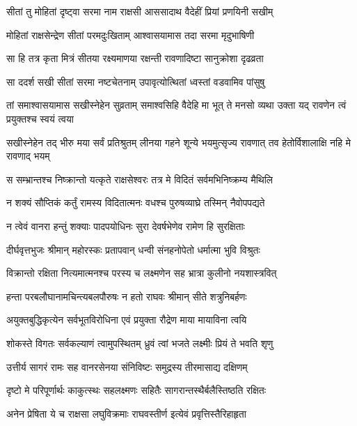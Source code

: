 
\twolineshloka
{सीतां तु मोहितां दृष्ट्वा सरमा नाम राक्षसी}
{आससादाथ वैदेहीं प्रियां प्रणयिनी सखीम्} %

\twolineshloka
{मोहितां राक्षसेन्द्रेण सीतां परमदुःखिताम्}
{आश्वासयामास तदा सरमा मृदुभाषिणी} %

\twolineshloka
{सा हि तत्र कृता मित्रं सीतया रक्ष्यमाणया}
{रक्षन्ती रावणादिष्टा सानुक्रोशा दृढव्रता} %

\twolineshloka
{सा ददर्श सखी सीतां सरमा नष्टचेतनाम्}
{उपावृत्योत्थितां ध्वस्तां वडवामिव पांसुषु} %

\threelineshloka
{तां समाश्वासयामास सखीस्नेहेन सुव्रताम्}
{समाश्वसिहि वैदेहि मा भूत् ते मनसो व्यथा}
{उक्ता यद् रावणेन त्वं प्रयुक्तश्च स्वयं त्वया} %

\threelineshloka
{सखीस्नेहेन तद् भीरु मया सर्वं प्रतिश्रुतम्}
{लीनया गहने शून्ये भयमुत्सृज्य रावणात्}
{तव हेतोर्विशालाक्षि नहि मे रावणाद् भयम्} %

\twolineshloka
{स सम्भ्रान्तश्च निष्क्रान्तो यत्कृते राक्षसेश्वरः}
{तत्र मे विदितं सर्वमभिनिष्क्रम्य मैथिलि} %

\twolineshloka
{न शक्यं सौप्तिकं कर्तुं रामस्य विदितात्मनः}
{वधश्च पुरुषव्याघ्रे तस्मिन् नैवोपपद्यते} %

\twolineshloka
{न त्वेवं वानरा हन्तुं शक्याः पादपयोधिनः}
{सुरा देवर्षभेणेव रामेण हि सुरक्षिताः} %

\twolineshloka
{दीर्घवृत्तभुजः श्रीमान् महोरस्कः प्रतापवान्}
{धन्वी संनहनोपेतो धर्मात्मा भुवि विश्रुतः} %

\twolineshloka
{विक्रान्तो रक्षिता नित्यमात्मनश्च परस्य च}
{लक्ष्मणेन सह भ्रात्रा कुलीनो नयशास्त्रवित्} %

\twolineshloka
{हन्ता परबलौघानामचिन्त्यबलपौरुषः}
{न हतो राघवः श्रीमान् सीते शत्रुनिबर्हणः} %

\twolineshloka
{अयुक्तबुद्धिकृत्येन सर्वभूतविरोधिना}
{एवं प्रयुक्ता रौद्रेण माया मायाविना त्वयि} %

\twolineshloka
{शोकस्ते विगतः सर्वकल्याणं त्वामुपस्थितम्}
{ध्रुवं त्वां भजते लक्ष्मीः प्रियं ते भवति शृणु} %

\twolineshloka
{उत्तीर्य सागरं रामः सह वानरसेनया}
{संनिविष्टः समुद्रस्य तीरमासाद्य दक्षिणम्} %

\twolineshloka
{दृष्टो मे परिपूर्णार्थः काकुत्स्थः सहलक्ष्मणः}
{सहितैः सागरान्तस्थैर्बलैस्तिष्ठति रक्षितः} %

\twolineshloka
{अनेन प्रेषिता ये च राक्षसा लघुविक्रमाः}
{राघवस्तीर्ण इत्येवं प्रवृत्तिस्तैरिहाहृता} %

